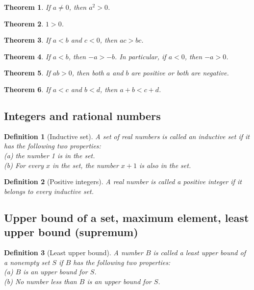 \documentclass{article}
\newtheorem{theorem}{Theorem}[section]
\newtheorem{definition}{Definition}[section]
\begin{document}
\begin{theorem}
If \(a \neq 0\), then \(a^2 > 0\).
\end{theorem}

\begin{theorem}
\(1 > 0\).
\end{theorem}

\begin{theorem}
If \(a < b\) and \(c < 0\), then \(ac > bc\).
\end{theorem}

\begin{theorem}
If \(a < b\), then \(-a > -b\). In particular, if \(a < 0\), then \(-a > 0\).
\end{theorem}

\begin{theorem}
If \(ab > 0\), then both \(a\) and \(b\) are positive or both are negative.
\end{theorem}

\begin{theorem}
If \(a < c\) and \(b < d\), then \(a + b < c + d\).
\end{theorem}

\subsection{Integers and rational numbers}

\begin{definition}[Inductive set]
A set of real numbers is called an inductive set if it has the following two properties: \\
(a) the number 1 is in the set. \\
(b) For every \(x\) in the set, the number \(x + 1\) is also in the set.
\end{definition}

\begin{definition}[Positive integers]
A real number is called a positive integer if it belongs to every inductive set.
\end{definition}

\subsection{Upper bound of a set, maximum element, least upper bound (supremum)}

\begin{definition}[Least upper bound]
A number \(B\) is called a least upper bound of a nonempty set \(S\) if \(B\) has the following two properties: \\
(a) \(B\) is an upper bound for \(S\). \\
(b) No number less than \(B\) is an upper bound for \(S\).
\end{definition}
\end{document}
